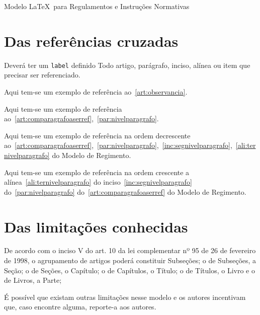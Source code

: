 \documentclass[11pt,twoside,a4paper]{inifsc}
\begin{document}
\begin{normativa}{Modelo \LaTeX~para Regulamentos e Instruções Normativas}
\section{Das referências cruzadas}

\begin{artigo}
    \item Deverá ter um \texttt{label} definido Todo artigo, parágrafo, inciso, alínea ou item que precisar ser referenciado.
    \begin{paragrafo}
        \item Aqui tem-se um exemplo de referência ao~\ref{art:observancia}.
        \item Aqui tem-se um exemplo de referência ao~\ref{art:comparagrafoaserref},~\ref{par:nivelparagrafo}.
        \item Aqui tem-se um exemplo de referência na ordem decrescente ao~\ref{art:comparagrafoaserref},~\ref{par:nivelparagrafo},~\ref{inc:segnivelparagrafo},~\ref{ali:ternivelparagrafo} do Modelo de Regimento.
        \item Aqui tem-se um exemplo de referência na ordem crescente a alínea~\ref{ali:ternivelparagrafo} do inciso~\ref{inc:segnivelparagrafo} do~\ref{par:nivelparagrafo} do~\ref{art:comparagrafoaserref} do Modelo de Regimento.
    \end{paragrafo}
\end{artigo}


\section{Das limitações conhecidas}

\begin{artigo}
    \item De acordo com o inciso V do art. 10 da lei complementar nº 95 de 26 de fevereiro de 1998, o agrupamento de artigos poderá constituir Subseções; o de Subseções, a Seção; o de Seções, o Capítulo; o de Capítulos, o Título; o de Títulos, o Livro e o de Livros, a Parte;
    \item É possível que existam outras limitações nesse modelo e os autores incentivam que, caso encontre alguma, reporte-a aos autores.
\end{artigo}

\end{normativa}
\end{document}
